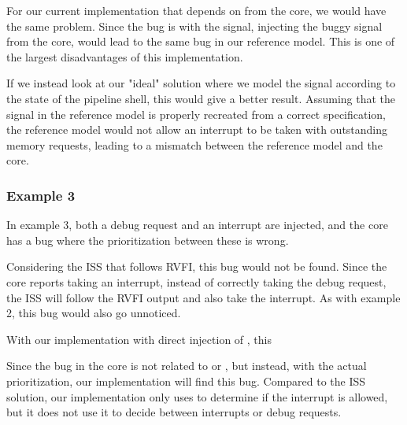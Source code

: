 For our current implementation that depends on  from the core, we would have the same problem. Since the bug is with the  signal, injecting the buggy signal from the core, would lead to the same bug in our reference model. This is one of the largest disadvantages of this implementation. 

If we instead look at our "ideal" solution where we model the  signal according to the state of the pipeline shell, this would give a better result. Assuming that the  signal in the reference model is properly recreated from a correct specification, the reference model would not allow an interrupt to be taken with outstanding memory requests, leading to a mismatch between the reference model and the core.


\subsubsection{Example 3}

In example 3, both a debug request and an interrupt are injected, and the core has a bug where the prioritization between these is wrong. 

Considering the ISS that follows RVFI, this bug would not be found. Since the core reports taking an interrupt, instead of correctly taking the debug request, the ISS will follow the RVFI output and also take the interrupt. As with example 2, this bug would also go unnoticed. 

With our implementation with direct injection of , this

Since the bug in the core is not related to  or , but instead, with the actual prioritization, our implementation will find this bug. Compared to the ISS solution, our implementation only uses  to determine if the interrupt is allowed, but it does not use it to decide between interrupts or debug requests.


